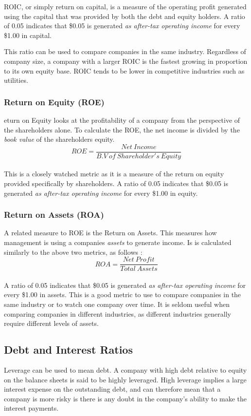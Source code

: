 \documentclass{article}
\begin{document}
ROIC, or simply return on capital, is a measure of the operating profit generated using the capital that was provided by both the debt and equity holders. A ratio of 0.05 indicates that \$0.05 is generated \textit{as after-tax operating income} for every \$1.00 in capital. 

This ratio can be used to compare companies in the same industry. Regardless of company size, a company with a larger ROIC is the fastest growing in proportion to its own equity base. ROIC tends to be lower in competitive industries such as utilities. 

\subsubsection{Return on Equity (ROE)}
eturn on Equity looks at the profitability of a company from the perspective of the shareholders alone. To calculate the ROE, the net income is divided by the \textit{book value} of the shareholders equity.
 \begin{equation}
    ROE = \frac{Net\: Income}{B.V\: of\: Shareholder's\: Equity}
\end{equation}\\
This is a closely watched metric as it is a measure of the return on equity provided specifically by shareholders. A ratio of 0.05 indicates that \$0.05 is generated \textit{as after-tax operating income} for every \$1.00 in equity. 

\subsubsection{Return on Assets (ROA)}
A related measure to ROE is the Return on Assets. This measures how management is using a companies \textit{assets} to generate income. Is is calculated similarly to the above two metrics, as follows :
 \begin{equation}
    ROA = \frac{Net\: Profit}{Total\: Assets}
\end{equation}\\

A ratio of 0.05 indicates that \$0.05 is generated \textit{as after-tax operating income} for every \$1.00 in assets. This is a good metric to use to compare companies in the same industry or to watch one company over time. It is seldom useful when comparing companies in different industries, as different industries generally require different levels of assets.


\subsection{Debt and Interest Ratios}
Leverage can be used to mean debt. A company with high debt relative to equity on the balance sheets is said to be highly leveraged. High leverage implies a large interest expense on the outstanding debt, and can therefore mean that a company is more risky is there is any doubt in the company's ability to make the interest payments. \\
\end{document}
